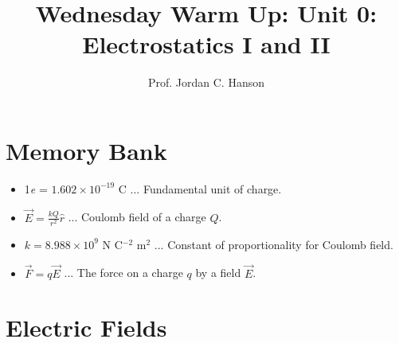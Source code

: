 \documentclass{article}
\begin{document}
\twocolumn

\title{Wednesday Warm Up: Unit 0: Electrostatics I and II}
\author{Prof. Jordan C. Hanson}

\maketitle

\section{Memory Bank}

\begin{itemize}
\item 1\textit{e} = $1.602 \times 10^{-19}$ C ... Fundamental unit of charge.
\item $\vec{E} = \frac{k Q}{r^2} \hat{r}$ ... Coulomb field of a charge $Q$.
\item $k = 8.988 \times 10^{9}$ N C$^{-2}$ m$^{2}$ ... Constant of proportionality for Coulomb field.
\item $\vec{F} = q\vec{E}$ ... The force on a charge $q$ by a field $\vec{E}$.
\end{itemize}
\normalsize

\section{Electric Fields}
\end{document}
